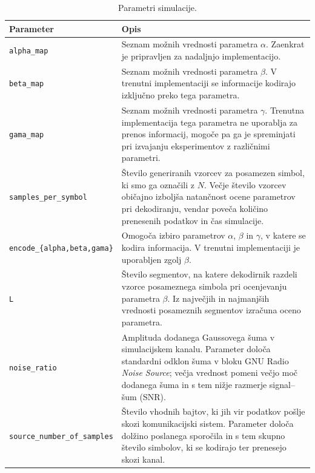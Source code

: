 \documentclass[a4paper, 12pt, openany]{book}
\begin{document}
\begin{table}[H]

\begin{tabular}{|l|p{9cm}|}
\hline
\textbf{Parameter} & \textbf{Opis} \\ \hline

\texttt{alpha\_map} &
Seznam možnih vrednosti parametra $\alpha$. Zaenkrat je pripravljen za nadaljnjo implementacijo. \\ \hline

\texttt{beta\_map} &
Seznam možnih vrednosti parametra $\beta$. V trenutni implementaciji se informacije kodirajo izključno preko tega parametra. \\ \hline

\texttt{gama\_map} &
Seznam možnih vrednosti parametra $\gamma$. Trenutna implementacija tega parametra ne uporablja za prenos informacij, mogoče pa ga je spreminjati pri izvajanju eksperimentov z različnimi parametri. \\ \hline

\texttt{samples\_per\_symbol} &
Število generiranih vzorcev za posamezen simbol, ki smo ga označili z $N$. Večje število vzorcev običajno izboljša natančnost ocene parametrov pri dekodiranju, vendar poveča količino prenesenih podatkov in čas simulacije. \\ \hline

\texttt{encode\_\{alpha,beta,gama\}} &
Omogoča izbiro parametrov $\alpha$, $\beta$ in $\gamma$, v katere se kodira informacija. V trenutni implementaciji je uporabljen zgolj $\beta$. \\ \hline

\texttt{L} &
Število segmentov, na katere dekodirnik razdeli vzorce posameznega simbola pri ocenjevanju parametra $\beta$. Iz največjih in najmanjših vrednosti posameznih segmentov izračuna oceno parametra. \\ \hline

\texttt{noise\_ratio} &
Amplituda dodanega Gaussovega šuma v simulacijskem kanalu. Parameter določa standardni odklon šuma v bloku GNU Radio \textit{Noise Source}; večja vrednost pomeni večjo moč dodanega šuma in s tem nižje razmerje signal–šum (SNR). \cite{gnuradioNoiseSource} \\ \hline

\texttt{source\_number\_of\_samples} &
Število vhodnih bajtov, ki jih vir podatkov pošlje skozi komunikacijski sistem. Parameter določa dolžino poslanega sporočila in s tem skupno število simbolov, ki se kodirajo ter prenesejo skozi kanal. \\ \hline

\end{tabular}
\caption{Parametri simulacije.}
\label{tab:parametri}
\end{table}
\end{document}
